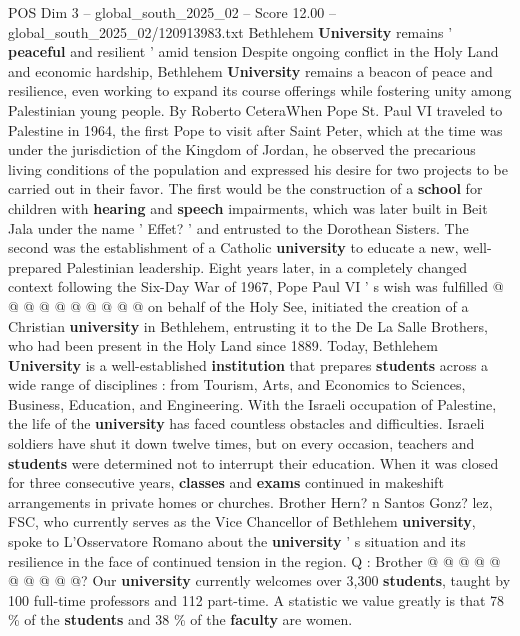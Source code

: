 \begin{textsample}{POS Dim 3 – global\_south\_2025\_02 – Score 12.00 – global\_south\_2025\_02/120913983.txt}  \label{ex:f3_pos_439}
Bethlehem \textbf{University} remains ' \textbf{peaceful} and resilient ' amid tension Despite ongoing conflict in the Holy Land and economic hardship, Bethlehem \textbf{University} remains a beacon of peace and resilience, even working to expand its course offerings while fostering unity among Palestinian young people.
By Roberto CeteraWhen Pope St.
Paul VI traveled to Palestine in 1964, the first Pope to visit after Saint Peter, which at the time was under the jurisdiction of the Kingdom of Jordan, he observed the precarious living conditions of the population and expressed his desire for two projects to be carried out in their favor.
The first would be the construction of a \textbf{school} for children with \textbf{hearing} and \textbf{speech} impairments, which was later built in Beit Jala under the name ' Effet? ' and entrusted to the Dorothean Sisters.
The second was the establishment of a Catholic \textbf{university} to educate a new, well-prepared Palestinian leadership.
Eight years later, in a completely changed context following the Six-Day War of 1967, Pope Paul VI ' s wish was fulfilled @ @ @ @ @ @ @ @ @ @ on behalf of the Holy See, initiated the creation of a Christian \textbf{university} in Bethlehem, entrusting it to the De La Salle Brothers, who had been present in the Holy Land since 1889.
Today, Bethlehem \textbf{University} is a well-established \textbf{institution} that prepares \textbf{students} across a wide range of disciplines : from Tourism, Arts, and Economics to Sciences, Business, Education, and Engineering.
With the Israeli occupation of Palestine, the life of the \textbf{university} has faced countless obstacles and difficulties.
Israeli soldiers have shut it down twelve times, but on every occasion, teachers and \textbf{students} were determined not to interrupt their education.
When it was closed for three consecutive years, \textbf{classes} and \textbf{exams} continued in makeshift arrangements in private homes or churches.
Brother Hern? n Santos Gonz? lez, FSC, who currently serves as the Vice Chancellor of Bethlehem \textbf{university}, spoke to L'Osservatore Romano about the \textbf{university} ' s situation and its resilience in the face of continued tension in the region.
Q : Brother @ @ @ @ @ @ @ @ @ @?
Our \textbf{university} currently welcomes over 3,300 \textbf{students}, taught by 100 full-time professors and 112 part-time.
A statistic we value greatly is that 78 \% of the \textbf{students} and 38 \% of the \textbf{faculty} are women.

\end{textsample}
